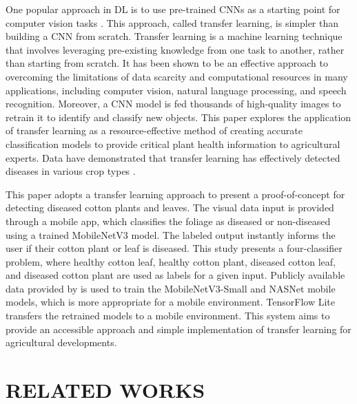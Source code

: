 \documentclass[conference]{IEEEtran}
\begin{document}
One popular approach in DL is to use pre-trained CNNs as a starting point for computer vision tasks \cite{Brownlee}. This approach, called transfer learning, is simpler than building a CNN from scratch. Transfer learning is a machine learning technique that involves leveraging pre-existing knowledge from one task to another, rather than starting from scratch. It has been shown to be an effective approach to overcoming the limitations of data scarcity and computational resources in many applications, including computer vision, natural language processing, and speech recognition. Moreover, a CNN model is fed thousands of high-quality images to retrain it to identify and classify new objects. This paper explores the application of transfer learning as a resource-effective method of creating accurate classification models to provide critical plant health information to agricultural experts. Data have demonstrated that transfer learning has effectively detected diseases in various crop types   \cite{Disease Detection} \cite{Disease Diagnosing}.\newline

\par This paper adopts a transfer learning approach to present a proof-of-concept for detecting diseased cotton plants and leaves. The visual data input is provided through a mobile app, which classifies the foliage as diseased or non-diseased using a trained MobileNetV3 model. The labeled output instantly informs the user if their cotton plant or leaf is diseased. This study presents a four-classifier problem, where healthy cotton leaf, healthy cotton plant, diseased cotton leaf, and diseased cotton plant are used as labels for a given input. Publicly available data provided by \cite{Kaggle} is used to train the MobileNetV3-Small and NASNet mobile models, which is more appropriate for a mobile environment. TensorFlow Lite transfers the retrained models to a mobile environment. This system aims to provide an accessible approach and simple implementation of transfer learning for agricultural developments.

\section{RELATED   WORKS}
\end{document}
